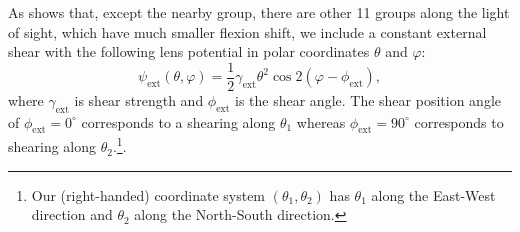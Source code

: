 \documentclass[useAMS,usenatbib]{mnras}
\def\kms {\rm km\,s^{-1}}
\begin{document}
As \citet{WilsonEtal16} shows that, except the nearby group, there are other 11 groups along the light of sight, which have much smaller flexion shift, 
we include a constant external shear with the following lens potential in polar coordinates $\theta$ and $\varphi$: 
\begin{equation}
\label{eq:arclight0}
\psi_{\text{ext}}(\theta, \varphi)=\frac{1}{2}\gamma_{\text{ext}}\theta^{2}\cos2(\varphi-\phi_{\text{ext}}),
\end{equation}
where $\gamma_{\text{ext}}$ is shear strength and $\phi_{\text{ext}}$
is the shear angle. The shear position angle of
$\phi_{\text{ext}}=0^{\circ}$ corresponds to a shearing along
$\theta_{1}$ whereas $\phi_{\text{ext}}=90^{\circ}$ corresponds to
shearing along $\theta_{2}$.\footnote{Our (right-handed) coordinate
system $(\theta_{1},\theta_2)$ has $\theta_1$ along the East-West
direction and $\theta_2$ along the North-South direction.}. 
\end{document}
